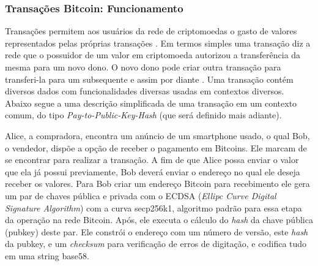 \documentclass[
	article,			%
	11pt,				%
	oneside,			%
	a4paper,			%
	chapter=TITLE,		%
	section=TITLE,		%
	subsection=TITLE,	%
	subsubsection=TITLE, %
	english,			%
	brazil,				%
	sumario=tradicional
	]{ifrs-artigo-abntex2}
\begin{document}
\subsubsection{Transações Bitcoin: Funcionamento}
Transações permitem aos usuários da rede de criptomoedas o gasto de valores representados pelas próprias transações \cite{bitcoinDev}. Em termos simples uma transação diz a rede que o possuidor de um valor em criptomoeda autorizou a transferência da mesma para um novo dono. O novo dono pode criar outra transação para transferi-la para um subsequente e assim por diante \cite{masterBit}.
Uma transação contém diversos dados com funcionalidades diversas usadas em contextos diversos. Abaixo segue a uma descrição simplificada de uma transação em um contexto comum, do tipo \textit{Pay-to-Public-Key-Hash} (que será definido mais adiante).

Alice, a compradora, encontra um anúncio de um smartphone usado, o qual Bob, o vendedor, dispõe a opção de receber o pagamento em Bitcoins. Ele marcam de se encontrar para realizar a transação.
A fim de que Alice possa enviar o valor que ela já possui previamente, Bob deverá enviar o endereço no qual ele deseja receber os valores.
Para Bob criar um endereço Bitcoin para recebimento ele gera um par de chaves pública e privada com o ECDSA (\textit{Ellipc Curve Digital Signature Algorithm})  com a curva secp256k1, algoritmo padrão para essa etapa da operação na rede Bitcoin. Após, ele executa o cálculo do \textit{hash} da chave pública (pubkey) deste par. Ele constrói o endereço com um número de versão, este \textit{hash} da pubkey, e um \textit{checksum} para verificação de erros de digitação, e codifica tudo em uma string base58.
\end{document}

